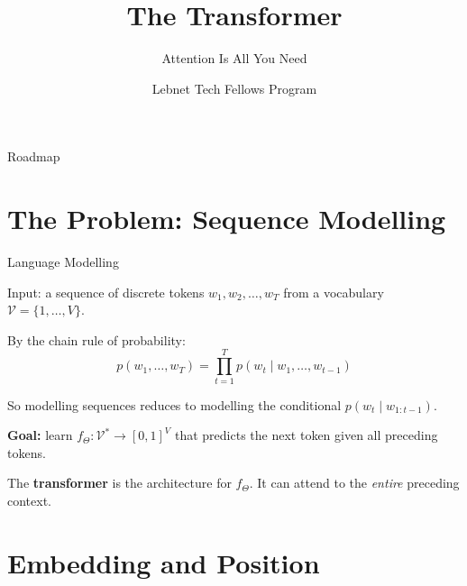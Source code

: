 \documentclass[aspectratio=169, professionalfonts]{beamer}
\title{The Transformer}
\subtitle{Attention Is All You Need}
\author{Lebnet Tech Fellows Program}
\date{}
\begin{document}
\begin{frame}
\titlepage
\end{frame}

\begin{frame}{Roadmap}
\tableofcontents
\end{frame}

\section{The Problem: Sequence Modelling}

\begin{frame}{Language Modelling}

Input: a sequence of discrete tokens
$w_1, w_2, \ldots, w_T$ from a vocabulary
$\mathcal{V} = \{1,\ldots,V\}$.

\bigskip

By the chain rule of probability:
$$p(w_1,\ldots,w_T)
  = \prod_{t=1}^{T} p(w_t \mid w_1,\ldots,w_{t-1})$$

So modelling sequences reduces to modelling the conditional
$p(w_t \mid w_{1:t-1})$.

\bigskip

\textbf{Goal:} learn $f_\Theta : \mathcal{V}^* \to [0,1]^V$
that predicts the next token given all preceding tokens.

\bigskip

The \textbf{transformer} is the architecture for $f_\Theta$.
It can attend to the \emph{entire} preceding context.

\end{frame}

\section{Embedding and Position}
\end{document}
